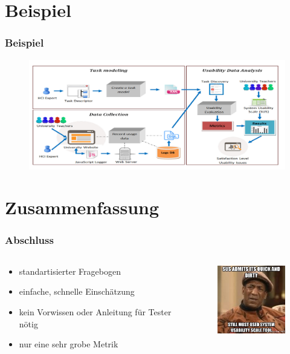 \documentclass[12pt, aspectratio=169]{beamer}
\begin{document}
\section{Beispiel}
\begin{frame}
	\frametitle{Beispiel}
		\begin{figure}
			\centering
			\includegraphics[keepaspectratio=true, width=1\textwidth]{./image/peter.png}
			\caption{\tiny{\cite{harrati2016exploring}}}
		\end{figure}
		
\end{frame}

\section{Zusammenfassung}
\begin{frame}
	\frametitle{Abschluss}
	\begin{columns}
		\begin{column}{0.5\textwidth}
			\begin{itemize}
				\item <1> standartisierter Fragebogen
				\item <1> einfache, schnelle Einschätzung
				\item <1> kein Vorwissen oder Anleitung für Tester nötig
				\item <1> nur eine sehr grobe Metrik
			\end{itemize}
		\end{column}
		\begin{column}{0.5\textwidth}
			\begin{figure}
				\centering
				\includegraphics[keepaspectratio=true, width=125px]{./image/sus-meme.png}
				\caption{\tiny{\cite{sp1}}}
			\end{figure}
		\end{column}
	\end{columns}
\end{frame}
\end{document}
